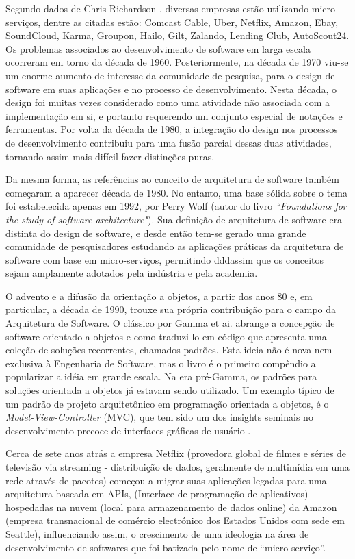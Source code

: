 \documentclass[journal]{IEEEtran}
\begin{document}
Segundo dados de Chris Richardson \cite{ChrisRichardson}, diversas empresas estão utilizando micro-serviços, dentre as citadas estão: Comcast Cable, Uber, Netflix, Amazon, Ebay, SoundCloud, Karma, Groupon, Hailo, Gilt, Zalando, Lending Club, AutoScout24.
Os problemas associados ao desenvolvimento de software em larga escala ocorreram em torno da década de 1960. Posteriormente, na década de 1970 viu-se um enorme aumento de interesse da comunidade de pesquisa, para o design de software em suas aplicações e no processo de desenvolvimento. Nesta década, o design foi muitas vezes considerado como uma atividade não associada com a implementação em si, e portanto requerendo um conjunto especial de notações e ferramentas. Por volta da década de 1980, a integração do design nos processos de desenvolvimento contribuiu para uma fusão parcial dessas duas atividades, tornando assim mais difícil fazer distinções puras.

Da mesma forma, as referências ao conceito de arquitetura de software também começaram a aparecer década de 1980. No entanto, uma base sólida sobre o tema foi estabelecida apenas em 1992, por Perry Wolf (autor do livro \emph{“Foundations for the study of software architecture"}). Sua definição de arquitetura de software era distinta do design de software, e desde então tem-se gerado uma grande comunidade de pesquisadores estudando as aplicações práticas da arquitetura de software com base em micro-serviços, permitindo dddassim que os conceitos sejam amplamente adotados pela indústria e pela academia.

O advento e a difusão da orientação a objetos, a partir dos anos 80 e, em particular, a década de 1990, trouxe sua própria contribuição para o campo da Arquitetura de Software. O clássico por Gamma et ai. abrange a concepção de software orientado a objetos e como traduzi-lo em código que apresenta uma coleção de soluções recorrentes, chamados padrões. Esta ideia não é nova nem exclusiva à Engenharia de Software, mas o livro é o primeiro compêndio a popularizar a idéia em grande escala. Na era pré-Gamma, os padrões para soluções orientada a objetos já estavam sendo utilizado. Um exemplo típico de um padrão de projeto arquitetônico em programação orientada a objetos, é o \emph{Model-View-Controller} (MVC), que tem sido um dos insights seminais no desenvolvimento precoce de interfaces gráficas de usuário \cite{nicoladragonietal}.

Cerca de sete anos atrás a empresa Netflix (provedora global de filmes e séries de televisão via streaming - distribuição de dados, geralmente de multimídia em uma rede através de pacotes) começou a migrar suas aplicações legadas para uma arquitetura baseada em APIs, (Interface de programação de aplicativos) hospedadas na nuvem (local para armazenamento de dados online) da Amazon (empresa transnacional de comércio electrónico dos Estados Unidos com sede em Seattle), influenciando assim, o crescimento de uma ideologia na área de desenvolvimento de softwares que foi batizada pelo nome de “micro-serviço”.
\end{document}
